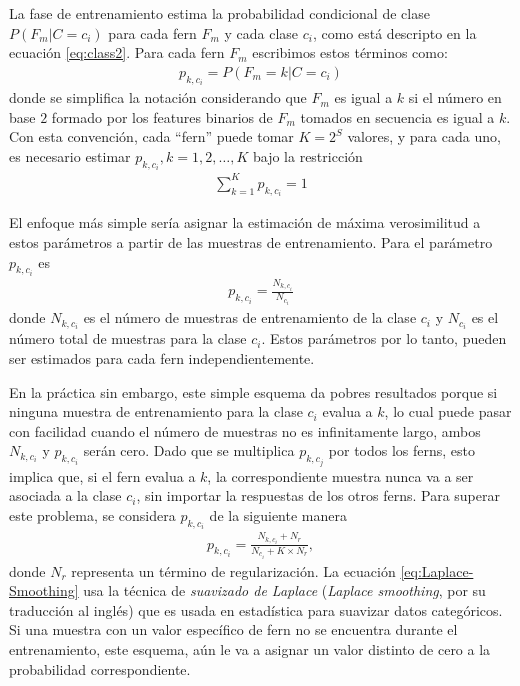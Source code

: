 		La fase de entrenamiento estima la probabilidad condicional de clase $P(F_m|C=c_i)$ para cada fern $F_m$	 y cada clase $c_i$, como está descripto en la ecuación \ref{eq:class2}. Para cada fern $F_m$ escribimos estos términos como:
		\begin{align}
			p_{k,c_i} = P(F_m = k | C = c_i)
		\end{align}
		donde se simplifica la notación considerando que $F_m$ es igual a $k$ si el número en base $2$ formado por los features binarios de $F_m$ tomados en secuencia es igual a $k$. Con esta convención, cada ``fern'' puede tomar $K=2^S$ valores, y para cada uno, es necesario estimar $p_{k,c_i}, k=1,2,\dots,K$ bajo la restricción
		\begin{align*}
			\sum_{k=1}^Kp_{k,c_i} = 1
		\end{align*}		
		
		El enfoque más simple sería asignar la estimación de máxima verosimilitud a estos parámetros a partir de las muestras de entrenamiento. Para el parámetro $p_{k,c_i}$ es
		\begin{align*}
			p_{k,c_i} = \frac{N_{k,c_i}}{N_{c_i}}
		\end{align*}
		donde $N_{k,c_i}$ es el número de muestras de entrenamiento de la clase $c_i$ y $N_{c_i}$ es el número total de muestras para la clase $c_i$. Estos parámetros por lo tanto, pueden ser estimados para cada fern independientemente.
		
		En la práctica sin embargo, este simple esquema da pobres resultados porque si ninguna muestra de entrenamiento para la clase $c_i$ evalua a $k$, lo cual puede pasar con facilidad cuando el número de muestras no es infinitamente largo, ambos $N_{k,c_i}$ y $p_{k,c_i}$ serán cero. Dado que se multiplica $p_{k,c_j}$ por todos los ferns, esto implica que, si el fern evalua a $k$, la correspondiente muestra nunca va a ser asociada a la clase $c_i$, sin importar la respuestas de los otros ferns. Para superar este problema, se considera $p_{k,c_i}$ de la siguiente manera
		\begin{align}
			\label{eq:Laplace-Smoothing}
			p_{k,c_i} = \frac{N_{k,c_i} + N_r}{N_{c_i} + K \times N_r},
		\end{align}
		donde $N_r$ representa un término de regularización. La ecuación \ref{eq:Laplace-Smoothing} usa la técnica de \textit{suavizado de Laplace} (\textit{Laplace smoothing}, por su traducción al inglés) que es usada en estadística para suavizar datos categóricos. Si una muestra con un valor específico de fern no se encuentra durante el entrenamiento, este esquema, aún le va a asignar un valor distinto de cero a la probabilidad correspondiente.
